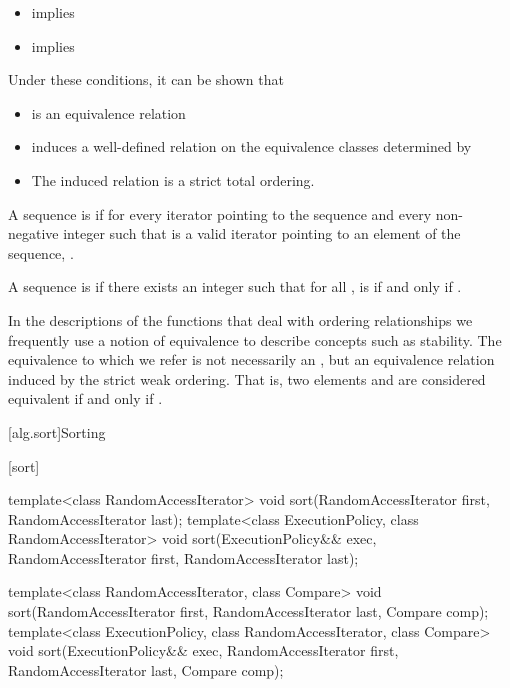 \begin{itemize}
\item
{}
implies
\item
{}
implies
\end{itemize}
\begin{note}
Under these conditions, it can be shown that
\begin{itemize}
\item
{}
is an equivalence relation
\item
{}
induces a well-defined relation on the equivalence
classes determined by
\item
The induced relation is a strict total ordering.
\end{itemize}
\end{note}

\pnum
A sequence is
 if for every iterator
pointing to the sequence and every non-negative integer
such that
is a valid iterator pointing to an element of the sequence,
.

\pnum
A sequence
is
if there exists an integer
such that for all
,
is  if and only if
.

\pnum
In the descriptions of the functions that deal with ordering relationships we frequently use a notion of
equivalence to describe concepts such as stability.
The equivalence to which we refer is not necessarily an
,
but an equivalence relation induced by the strict weak ordering.
That is, two elements
and
are considered equivalent if and only if
.

[alg.sort]{Sorting}

[sort]{}

%
\begin{itemdecl}
template<class RandomAccessIterator>
  void sort(RandomAccessIterator first, RandomAccessIterator last);
template<class ExecutionPolicy, class RandomAccessIterator>
  void sort(ExecutionPolicy&& exec,
            RandomAccessIterator first, RandomAccessIterator last);

template<class RandomAccessIterator, class Compare>
  void sort(RandomAccessIterator first, RandomAccessIterator last,
            Compare comp);
template<class ExecutionPolicy, class RandomAccessIterator, class Compare>
  void sort(ExecutionPolicy&& exec,
            RandomAccessIterator first, RandomAccessIterator last,
            Compare comp);
\end{itemdecl}

